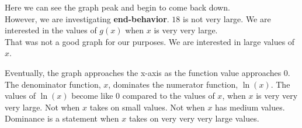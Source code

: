 \documentclass{ximera}
\begin{document}
\begin{example}
\begin{image}
\end{image}




Here we can see the graph peak and begin to come back down.   \\


However, we are investigating \textbf{end-behavior}.  $18$ is not very large. We are interested in the values of $g(x)$ when $x$ is very very large. \\  

That was not a good graph for our purposes.  We are interested in large values of $x$.









\begin{image}
\end{image}






Eventually, the graph approaches the x-axis as the function value approaches $0$. \\


The denominator function, $x$, dominates the numerator function, $\ln(x)$.   The values of $\ln(x)$ become like $0$ compared to the values of $x$, when $x$ is very very very large. Not when $x$ takes on small values.  Not when $x$ has medium values.  Dominance is a statement when $x$ takes on very very very large values.




\end{example}
\end{document}
